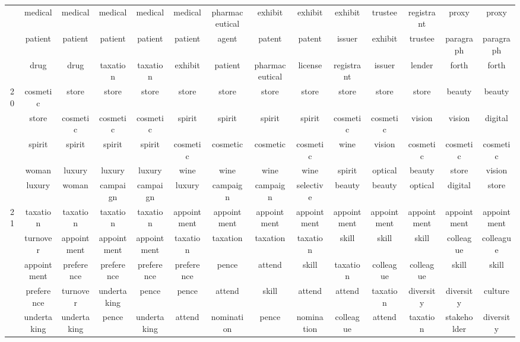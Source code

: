\documentclass[12pt,journal,letterpaper,oneside,onecolumn]{IEEEtran}
\begin{document}
\begin{center}
{\begin{tabular}{c|c|c|c|c|c|c|c|c|c|c|c|c|c}
         & medical & medical & medical & medical & medical & pharmaceutical & exhibit & exhibit & exhibit & trustee & registrant & proxy & proxy \\ 
         & patient & patient & patient & patient & patient & agent & patent & patent & issuer & exhibit & trustee & paragraph & paragraph \\ 
         & drug & drug & taxation & taxation & exhibit & patient & pharmaceutical & license & registrant & issuer & lender & forth & forth \\ 
        \hline
        20 & cosmetic & store & store & store & store & store & store & store & store & store & store & beauty & beauty \\ 
         & store & cosmetic & cosmetic & cosmetic & spirit & spirit & spirit & spirit & cosmetic & cosmetic & vision & vision & digital \\ 
         & spirit & spirit & spirit & spirit & cosmetic & cosmetic & cosmetic & cosmetic & wine & vision & cosmetic & cosmetic & cosmetic \\ 
         & woman & luxury & luxury & luxury & wine & wine & wine & wine & spirit & optical & beauty & store & vision \\ 
         & luxury & woman & campaign & campaign & luxury & campaign & campaign & selective & beauty & beauty & optical & digital & store \\ 
        \hline
        21 & taxation & taxation & taxation & taxation & appointment & appointment & appointment & appointment & appointment & appointment & appointment & appointment & appointment \\ 
         & turnover & appointment & appointment & appointment & taxation & taxation & taxation & taxation & skill & skill & skill & colleague & colleague \\ 
         & appointment & preference & preference & preference & preference & pence & attend & skill & taxation & colleague & colleague & skill & skill \\ 
         & preference & turnover & undertaking & pence & pence & attend & skill & attend & attend & taxation & diversity & diversity & culture \\ 
         & undertaking & undertaking & pence & undertaking & attend & nomination & pence & nomination & colleague & attend & taxation & stakeholder & diversity \\ 
    \end{tabular}}
\end{center}
\end{document}
